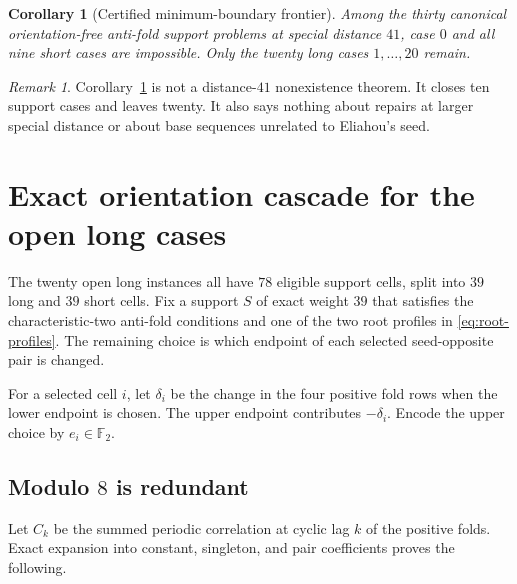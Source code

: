 \documentclass[11pt]{article}
\newtheorem{corollary}[theorem]{Corollary}
\theoremstyle{remark}
\newtheorem{remark}[theorem]{Remark}
\newcommand{\F}{\mathbb F}
\begin{document}
\begin{corollary}[Certified minimum-boundary frontier]
\label{cor:frontier}
Among the thirty canonical orientation-free anti-fold support problems at
special distance $41$, case $0$ and all nine short cases are impossible.
Only the twenty long cases $1,\ldots,20$ remain.
\end{corollary}

\begin{remark}
Corollary~\ref{cor:frontier} is not a distance-$41$ nonexistence theorem.
It closes ten support cases and leaves twenty.  It also says nothing about
repairs at larger special distance or about base sequences unrelated to
Eliahou's seed.
\end{remark}

\section{Exact orientation cascade for the open long cases}
\label{sec:orientation}

The twenty open long instances all have $78$ eligible support cells,
split into $39$ long and $39$ short cells.  Fix a support
$S$ of exact weight $39$ that satisfies the characteristic-two anti-fold
conditions and one of the two root profiles in \eqref{eq:root-profiles}.  The
remaining choice is which endpoint of each selected seed-opposite pair is
changed.

For a selected cell $i$, let $\delta_i$ be the change in the four positive
fold rows when the lower endpoint is chosen.  The upper endpoint contributes
$-\delta_i$.  Encode the upper choice by $e_i\in\F_2$.

\subsection{Modulo \texorpdfstring{$8$}{8} is redundant}

Let $C_k$ be the summed periodic correlation at cyclic lag $k$ of the
positive folds.  Exact expansion into constant, singleton, and pair
coefficients proves the following.
\end{document}
